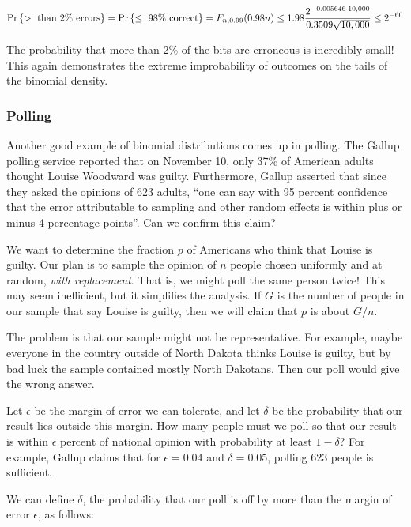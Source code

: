 \documentclass[11pt,twoside]{article}
\begin{document}
\begin{equation*}
\mathop{\textup{Pr}}\nolimits\left\{> \mbox{ than 2\% errors}\right\}
    =  \mathop{\textup{Pr}}\nolimits\left\{\leq \mbox{ 98\% correct}\right\} 
    =  F_{n, 0.99}(0.98n) 
    \leq  1.98 \frac{2^{-0.005646 \cdot 10,000}}{0.3509 \sqrt{10,000}}
    \leq  2^{-60}
\end{equation*}

The probability that more than 2\% of the bits are erroneous is
incredibly small!  This again demonstrates the extreme improbability
of outcomes on the tails of the binomial density.
\iffalse

\subsubsection{Polling}

Another good example of binomial distributions comes up in polling.
The Gallup polling service reported that on November 10, only 37\% of
American adults thought Louise Woodward was guilty.  Furthermore,
Gallup asserted that since they asked the opinions of 623 adults,
``one can say with 95 percent confidence that the error attributable
to sampling and other random effects is within plus or minus 4
percentage points''.  Can we confirm this claim?

We want to determine the fraction $p$ of Americans who think that
Louise is guilty.  Our plan is to sample the opinion of $n$ people
chosen uniformly and at random, {\em with replacement}.  That is, we
might poll the same person twice!  This may seem inefficient, but it
simplifies the analysis.  If $G$ is the number of people in our sample
that say Louise is guilty, then we will claim that $p$ is about $G/n$.

The problem is that our sample might not be representative.  For
example, maybe everyone in the country outside of North Dakota thinks
Louise is guilty, but by bad luck the sample contained mostly North
Dakotans.  Then our poll would give the wrong answer.

Let $\epsilon$ be the margin of error we can tolerate, and let
$\delta$ be the probability that our result lies outside this margin.
How many people must we poll so that our result is within $\epsilon$
percent of national opinion with probability at least $1-\delta$?  For
example, Gallup claims that for $\epsilon = 0.04$ and $\delta = 0.05$,
polling $623$ people is sufficient.

We can define $\delta$, the probability that our poll is off by more
than the margin of error $\epsilon$, as follows:
\end{document}
